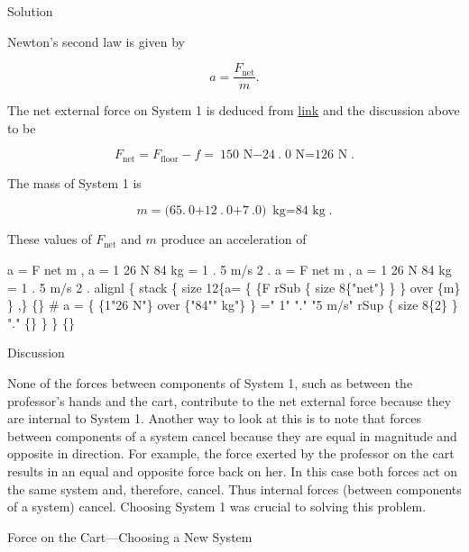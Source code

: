\documentclass[
]{book}
\newenvironment{tinysection}{}{}
\begin{document}
\begin{tinysection}

{Solution}

\end{tinysection}

Newton's second law is given by

\leavevmode\hypertarget{eip-id1456392}{}%
\[{a = \frac{F_{\text{net}}}{m}}.\]

The net external force on System 1 is deduced from
\protect\hyperlink{import-auto-id2324690}{link} and the
discussion above to be

\leavevmode\hypertarget{eip-id1515829}{}%
\[{{{F_{\text{net}} = {F_{\text{floor}} - f}} = {\text{150\ N} - \text{24}}}\text{.}{\text{0\ N} = \text{126\ N}}}.\]

The mass of System 1 is

\leavevmode\hypertarget{eip-id1213154}{}%
\[{{m = (}\text{65}\text{.}{\text{0} + \text{12}}\text{.}{\text{0} + \text{7}}\text{.}0){\ \text{kg} = \text{84\ kg}}}.\]

These values of \(F_{\text{net}}{}\) and \(m{}\) produce an acceleration of

\leavevmode\hypertarget{eip-id1741589}{}%
{a = F net m , a = 1 26 N 84 kg = 1 . 5 m/s 2 . a = F net m , a = 1 26
N 84 kg = 1 . 5 m/s 2 . alignl \{ stack \{ size 12\{a= \{ \{F rSub \{ size
8\{"net"\} \} \} over \{m\} \} ,\} \{\} \# a = \{ \{1"26 N"\} over \{"84""
kg"\} \} =" 1" "." "5 m/s" rSup \{ size 8\{2\} \} "." \{\} \} \} \{\}}

\begin{tinysection}

{Discussion}

\end{tinysection}

None of the forces between components of System 1, such as between the
professor's hands and the cart, contribute to the net external force
because they are internal to System 1. Another way to look at this is to
note that forces between components of a system cancel because they are
equal in magnitude and opposite in direction. For example, the force
exerted by the professor on the cart results in an equal and opposite
force back on her. In this case both forces act on the same system and,
therefore, cancel. Thus internal forces (between components of a system)
cancel. Choosing System 1 was crucial to solving this problem.

\hypertarget{fs-id2092526}{}
Force on the Cart---Choosing a New System
\end{document}
